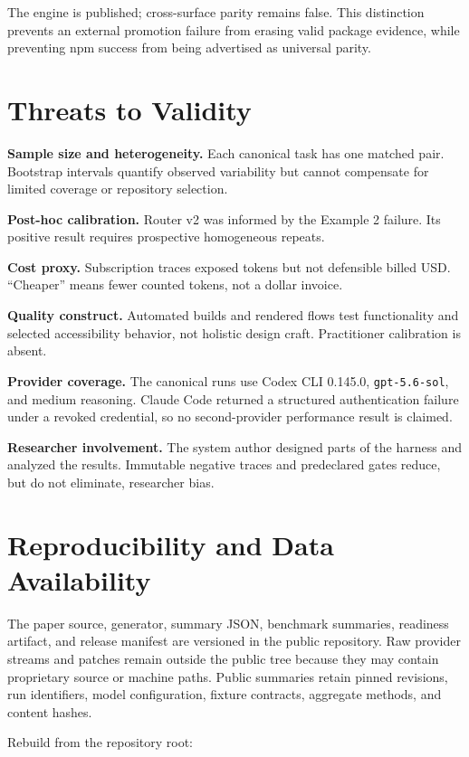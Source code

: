 \documentclass[10pt,twocolumn]{article}
\newcommand{\code}[1]{\texttt{\small #1}}
\begin{document}
The engine is published; cross-surface parity remains false. This distinction
prevents an external promotion failure from erasing valid package evidence,
while preventing npm success from being advertised as universal parity.

\section{Threats to Validity}

\textbf{Sample size and heterogeneity.} Each canonical task has one matched
pair. Bootstrap intervals quantify observed variability but cannot compensate
for limited coverage or repository selection.

\textbf{Post-hoc calibration.} Router v2 was informed by the Example 2 failure.
Its positive result requires prospective homogeneous repeats.

\textbf{Cost proxy.} Subscription traces exposed tokens but not defensible
billed USD. ``Cheaper'' means fewer counted tokens, not a dollar invoice.

\textbf{Quality construct.} Automated builds and rendered flows test
functionality and selected accessibility behavior, not holistic design craft.
Practitioner calibration is absent.

\textbf{Provider coverage.} The canonical runs use Codex CLI 0.145.0,
\code{gpt-5.6-sol}, and medium reasoning. Claude Code returned a structured
authentication failure under a revoked credential, so no second-provider
performance result is claimed.

\textbf{Researcher involvement.} The system author designed parts of the
harness and analyzed the results. Immutable negative traces and predeclared
gates reduce, but do not eliminate, researcher bias.

\section{Reproducibility and Data Availability}

The paper source, generator, summary JSON, benchmark summaries, readiness
artifact, and release manifest are versioned in the public repository. Raw
provider streams and patches remain outside the public tree because they may
contain proprietary source or machine paths. Public summaries retain pinned
revisions, run identifiers, model configuration, fixture contracts, aggregate
methods, and content hashes.

Rebuild from the repository root:
\end{document}
